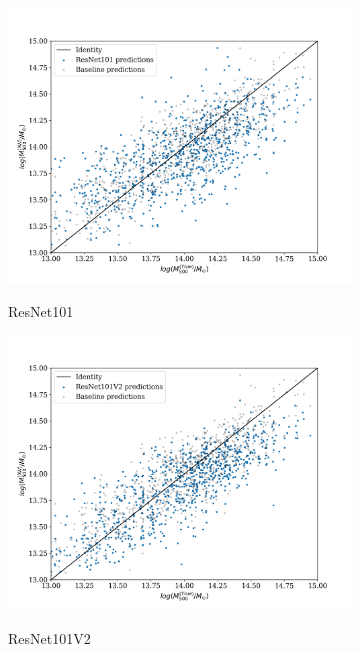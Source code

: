 \begin{figure}[H]
\begin{subfigure}{.325\textwidth}
    \centering
    \includegraphics[width=\linewidth]{images/Chapter4/Results/test_ResNet101_scatter.png}
    \label{fig:test_ResNet101_scatter}
    \caption{ResNet101}
\end{subfigure}
\begin{subfigure}{.325\textwidth}
    \centering
    \includegraphics[width=\linewidth]{images/Chapter4/Results/test_ResNet101V2_scatter.png}
    \label{fig:test_ResNet101V2_scatter}
    \caption{ResNet101V2}
\end{subfigure}
\begin{subfigure}{.325\textwidth}
    \centering

\end{subfigure}
\end{figure}
